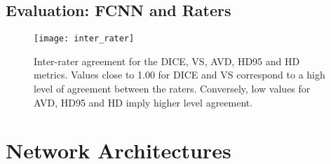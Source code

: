 \begin{figure}[htbp]
	\centering
	\hfill
	\caption[Post-processing impact on HD95]{}
	\label{fig:pp_boxplots_hd95}  
\end{figure}

\begin{figure}[htbp]
	\centering
	\hfill
	\caption[Post-processing impact on HD]{}
	\label{fig:pp_boxplots_hd}  
\end{figure}

\section{Evaluation: FCNN and Raters} %

\begin{figure}[htbp]	
	\texttt{[image: inter\_rater]}
    \caption[Inter-Rater Agreement]{Inter-rater agreement for the DICE, VS, AVD, HD95 and HD metrics. Values close to 1.00 for DICE and VS correspond to a high level of agreement between the raters. Conversely, low values for AVD, HD95 and HD imply higher level agreement.}
    \label{fig:inter_rater}
\end{figure}

\chapter{Network Architectures} %

